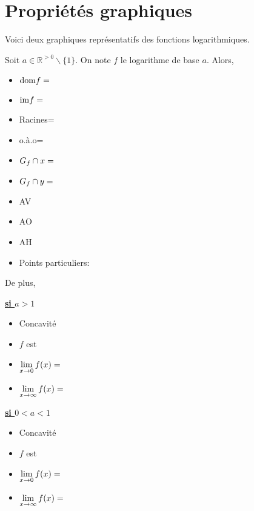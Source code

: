 \documentclass[a4paper,12pt,singlepage]{report}
\newcommand{\IR}{\mathbb{R}}
\newcommand{\dom}{\mathrm{dom}}
\newcommand{\im}{\mathrm{im}}
\begin{document}
\section{Propriétés graphiques}
\label{sec:orgff3480e}
Voici deux graphiques représentatifs des fonctions logarithmiques.
\begin{center}

\end{center}
\begin{propriete}
Soit \(a\in\IR^{>0}\backslash\{1\}\). On note \(f\) le logarithme de
base \(a\). Alors,

\par \setlength{\columnseprule}{2 pt}
          \begin{minipage}[t]{\linewidth}
          \begin{multicols}{2}
\begin{itemize}
\item \(\dom{f}=\dotfill\)
\item \(\im{f}=\dotfill\)
\item Racines=\dotfill
\item o.à.o=\dotfill
\item \(G_f\cap x=\dotfill\)
\item \(G_f\cap y=\dotfill\)
\item AV\dotfill
\item AO\dotfill
\item AH\dotfill
\item Points particuliers:\dotfill
\end{itemize}



\end{multicols}\end{minipage}

De plus,
\par \setlength{\columnseprule}{2 pt}
          \begin{minipage}[t]{\linewidth}
          \begin{multicols}{2}
\uline{\textbf{si \(a>1\)}}
\begin{itemize}
\item Concavité \dotfill
\item \(f\) est \dotfill
\item \(\lim\limits_{x\to 0}f(x)=\dotfill\)
\item \(\lim\limits_{x\to\infty}f(x)=\dotfill\)
\end{itemize}
\columnbreak
 \uline{\textbf{si \(0<a<1\)}}
\begin{itemize}
\item Concavité \dotfill
\item \(f\) est \dotfill
\item \(\lim\limits_{x\to 0}f(x)=\dotfill\)
\item \(\lim\limits_{x\to\infty}f(x)=\dotfill\)
\end{itemize}


\end{multicols}\end{minipage}
\end{propriete}
\end{document}
